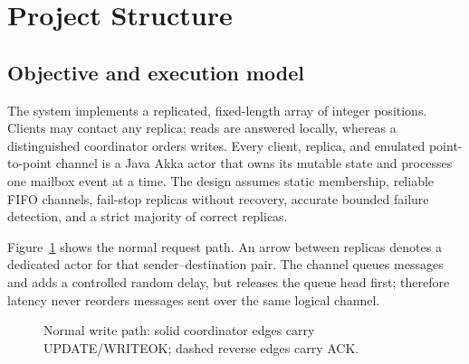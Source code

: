 \section{Project Structure}

\subsection{Objective and execution model}

The system implements a replicated, fixed-length array of integer positions. Clients may contact any replica; reads are answered locally, whereas a distinguished coordinator orders writes. Every client, replica, and emulated point-to-point channel is a Java Akka actor that owns its mutable state and processes one mailbox event at a time. The design assumes static membership, reliable FIFO channels, fail-stop replicas without recovery, accurate bounded failure detection, and a strict majority of correct replicas.

Figure~\ref{fig:architecture} shows the normal request path. An arrow between replicas denotes a dedicated  actor for that sender--destination pair. The channel queues messages and adds a controlled random delay, but releases the queue head first; therefore latency never reorders messages sent over the same logical channel.

\begin{figure}[h]
\centering
{}
\caption{Normal write path: solid coordinator edges carry UPDATE/WRITEOK; dashed reverse edges carry ACK.}
\label{fig:architecture}
\end{figure}

